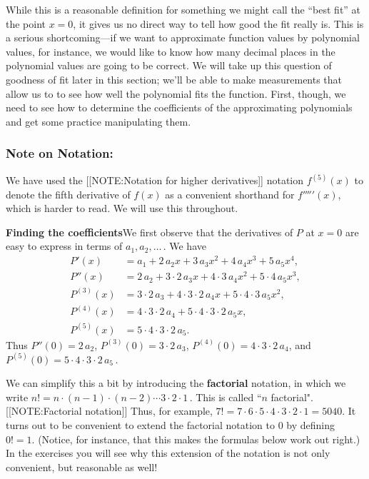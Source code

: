 While this is a reasonable definition for something we might call the
``best fit'' at the point $x=0$, it gives us no direct way to tell how
good the fit really is.  This is a serious shortcoming---if we want to
approximate function values by polynomial values, for instance, we
would like to know how many decimal places in the polynomial values
are going to be correct.  We will take up this question of goodness of
fit later in this section; we'll be able to make measurements that
allow us to to see how well the polynomial fits the function.  First,
though, we need to see how to determine the coefficients of the
approximating polynomials and get some practice manipulating them.



\subsubsection{Note on Notation:}
We have used the
[[NOTE:Notation for  higher derivatives]]
notation $f^{(5)}(x)$ to denote the fifth derivative of $f(x)$ as a
convenient shorthand for $f'''''(x)$, which is harder to read.  We
will use this throughout.




{\bf Finding the coefficients}\quad We first observe that the
derivatives of $P$ at $x=0$ are easy to express in terms of
$a_1,a_2,\ldots \, .$ We have
\begin{align*}
P'(x) &= a_1+2\,a_2x+3\,a_3x^2+4\,a_4x^3+5\,a_5x^4, \\
P''(x)&= 2\,a_2+3\cdot2\,a_3x+4\cdot3\,a_4x^2+5\cdot4\,a_5x^3, \\
P^{(3)}(x)&= 3\cdot2\,a_3+4\cdot3\cdot2\,a_4x+5\cdot4\cdot3\,a_5x^2, \\
P^{(4)}(x)&= 4\cdot3\cdot2\,a_4+5\cdot4\cdot3\cdot2\,a_5x, \\
P^{(5)}(x)&= 5\cdot4\cdot3\cdot2\,a_5.
\end{align*}
Thus $P''(0)=2\,a_2$, $P^{(3)}(0)= 3\cdot2\,a_3$, $P^{(4)}(0)=
4\cdot3\cdot2\,a_4$, and $P^{(5)}(0)=5\cdot4\cdot3\cdot2\,a_5 \, .$

We can simplify this a bit by introducing the {\bf
  factorial} notation, in which we write
$n!=n\cdot(n-1)\cdot(n-2)\cdots3\cdot2\cdot1 \, .$ This is called
``$n$ factorial".
[[NOTE:Factorial notation]]
Thus, for example, $7!=7\cdot6\cdot5\cdot4\cdot3\cdot2\cdot1 = 5040.$
It turns out to be convenient to extend the factorial notation to 0 by
defining $0!=1.$ (Notice, for instance, that this makes the formulas
below work out right.)  In the exercises you will see why this
extension of the notation is not only convenient, but reasonable as
well!

